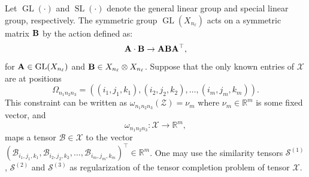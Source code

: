 \documentclass{article}
\newcommand{\R}{{\mathbb R}}
\newcommand{\GL}{\operatorname{GL}}
\newcommand{\SL}{\operatorname{SL}}
\newcommand{\T}{\mathcal}
\newcommand{\m}[1]{{\bf{#1}}}
\newcommand{\ms}[1]{{\mathscr{#1}}}
\begin{document}
Let $\GL(\cdot)$ and $\SL(\cdot)$ denote the general linear group and special linear group, respectively. The symmetric group $\GL(X_{n_\ell})$ acts on a symmetric matrix $\m B$ by the action defined as:
$$\m A\cdot \m B\to \m A\m B\m A^\top,$$
for $\m A\in \GL(X_{n_\ell}) $ and $\m B \in X_{n_\ell}\otimes X_{n_\ell}$.
Suppose that the only known entries of $\T X$ are at positions 
$$\Omega_{n_1n_2n_3}=((i_1,j_1,k_1),(i_2,j_2,k_2),\dots,(i_m,j_m,k_m)).$$
This 
constraint can be written as $\omega_{n_1n_2n_3}(\T Z)=\nu_{m}$ where $\nu_m\in \R^m$ is some fixed vector, and 
$$\omega_{n_1n_2n_3}:\ms X\to \R^m,$$ maps a tensor $\T B\in \ms X$ to
the vector \\$(\T B_{i_1,j_1,k_1},\T B_{i_2,j_2,k_2},\dots,\T B_{i_m,j_m,k_m})^\top\in \R^m$.
One may use the similarity tensors $\T S^{(1)}$, $\T S^{(2)}$ and $\T S^{(3)}$ as regularization of the tensor completion problem of tensor $\T X$. 
\end{document}
